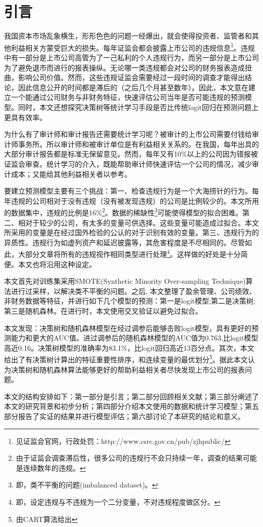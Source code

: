 \documentclass{article}
\begin{document}
\section{引言}
\par 我国资本市场乱象横生，形形色色的问题一经爆出，就会使得投资者、监管者和其他利益相关方蒙受巨大的损失。每年证监会都会披露上市公司的违规信息\footnote{见证监会官网，行政处罚：http://www.csrc.gov.cn/pub/zjhpublic/}。违规中有一部分是上市公司高管为了一己私利的个人违规行为，而另一部分是上市公司为了避免退市而进行的报表操纵。无论哪一类违规都会对公司的财务报表造成扭曲，影响公司价值。然而，这些违规证监会需要经过一段时间的调查才能得出结论，因此信息公开的时间都是滞后的（之后几个月甚至数年）。因此，本文意在建立一个能通过公司财务与非财务特征，快速评估公司当年是否可能违规的预测模型。同时，本文还想探究决策树等统计学习手段是否比传统logit回归在预测问题上更具有效率。
\par 为什么有了审计师和审计报告还需要统计学习呢？被审计的上市公司需要付钱给审计师事务所。所以审计师和被审计单位是有利益相关关系的。在我国，每年出具的大部分审计报告都是标准无保留意见。然而，每年又有10\%以上的公司因为错报被证监会审查。统计学习的介入，既能帮助审计师快速评估一个公司的情况，减少审计成本；又能给其他利益相关者以参考。
\par 要建立预测模型主要有三个挑战：第一、检查违规行为是一个大海捞针的行为\cite{Perols2015Finding}。每年违规的公司相对于没有违规（没有被发现违规）的公司是比例较少的。本文所用的数据集中，违规的比例是16\%\footnote{由于证监会调查滞后性，很多公司的违规行不会只持续一年，调查的结果可能是连续数年的违规。}。数据的稀缺性\footnote{即，类不平衡的问题(imbalanced dataset)。}可能使得模型的拟合困难。第二、相对于较少的公司，有太多的变量可供选择\cite{Perols2015Finding}。这些变量可能造成过拟合。本文所采用的变量是在经过国外检验的公认的对于识别有效的变量。第三、违规行为的异质性。违规行为如虚列资产和延迟披露等，其危害程度是不尽相同的。尽管如此，大部分文章将所有的违规视作相同类型进行处理\footnote{即，设定违规与不违规为一个二分变量，不对违规程度做区分。}。这样做的好处是十分简便。本文也将沿用这种设定。
\par 本文首先对训练集采用SMOTE(Synthetic Minority Over-sampling Technique)\cite{Chawla2002SMOTE}算法进行过采样，以解决类不平衡的问题。之后, 本文整理了盈余管理、公司绩效、非财务数据等特征，并进行如下几个模型的预测：第一是logit模型;第二是决策树;第三是随机森林。在进行时，本文使用交叉验证以避免过拟合。
\par 本文发现：决策树和随机森林模型在经过调参后能够击败logit模型，具有更好的预测能力和更大的AUC值。进过调参后的随机森林模型的AUC值为0.763,比logit模型高近0.16。决策树模型的准确率为83.1\%，比logit回归高近13百分点。其次，本文给出了有决策树计算出的特征重要性排序，和连续变量的最优划分\footnote{由CART算法给出}。据此本文认为决策树和随机森林算法能够更好的帮助利益相关者尽快发现上市公司的报表问题。
\par 本文的结构安排如下：第一部分是引言；第二部分回顾相关文献；第三部分阐述了本文的研究背景和初步分析；第四部分介绍本文使用的数据和统计学习模型；第五部分报告了实证的结果并进行模型评估；第六部讨论了本研究的结论和意义。
\end{document}
